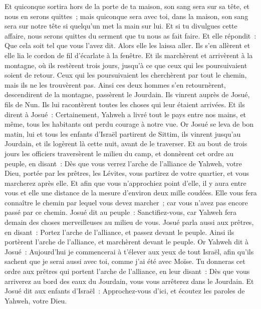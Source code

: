 \begin{multicols}{2}
Et quiconque sortira hors de la porte de ta maison, son sang sera sur sa tête, et nous en serons quittes~; mais quiconque sera avec toi, dans la maison, son sang sera sur notre tête si quelqu'un met la main sur lui.
Et si tu divulgues cette affaire, nous serons quittes du serment que tu nous as fait faire.
Et elle répondit~: Que cela soit tel que vous l'avez dit. Alors elle les laissa aller. Ils s'en allèrent et elle lia le cordon de fil d'écarlate à la fenêtre.
Et ils marchèrent et arrivèrent à la montagne, où ils restèrent trois jours, jusqu'à ce que ceux qui les poursuivaient soient de retour. Ceux qui les poursuivaient les cherchèrent par tout le chemin, mais ils ne les trouvèrent pas.
Ainsi ces deux hommes s'en retournèrent, descendirent de la montagne, passèrent le Jourdain. Ils vinrent auprès de Josué, fils de Nun. Ils lui racontèrent toutes les choses qui leur étaient arrivées.
Et ils dirent à Josué~: Certainement, Yahweh a livré tout le pays entre nos mains, et même, tous les habitants ont perdu courage à notre vue.
\VerseOne{}Or Josué se leva de bon matin, lui et tous les enfants d'Israël partirent de Sittim, ils vinrent jusqu'au Jourdain, et ils logèrent là cette nuit, avant de le traverser.
Et au bout de trois jours les officiers traversèrent le milieu du camp,
et donnèrent cet ordre au peuple, en disant~: Dès que vous verrez l'arche de l'alliance de Yahweh, votre Dieu, portée par les prêtres, les Lévites, vous partirez de votre quartier, et vous marcherez après elle.
Et afin que vous n'approchiez point d'elle, il y aura entre vous et elle une distance de la mesure d'environ deux mille coudées. Elle vous fera connaître le chemin par lequel vous devez marcher~; car vous n'avez pas encore passé par ce chemin.
Josué dit au peuple~: Sanctifiez-vous, car Yahweh fera demain des choses merveilleuses au milieu de vous.
Josué parla aussi aux prêtres, en disant~: Portez l'arche de l'alliance, et passez devant le peuple. Ainsi ils portèrent l'arche de l'alliance, et marchèrent devant le peuple.
Or Yahweh dit à Josué~: Aujourd'hui je commencerai à t'élever aux yeux de tout Israël, afin qu'ils sachent que je serai aussi avec toi, comme j'ai été avec Moïse.
Tu donneras cet ordre aux prêtres qui portent l'arche de l'alliance, en leur disant~: Dès que vous arriverez au bord des eaux du Jourdain, vous vous arrêterez dans le Jourdain.
Et Josué dit aux enfants d'Israël~: Approchez-vous d'ici, et écoutez les paroles de Yahweh, votre Dieu.

\end{multicols}
